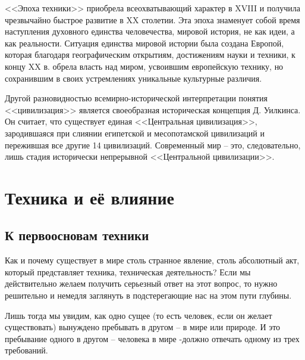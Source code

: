 <<Эпоха техники>> приобрела всеохватывающий характер в XVIII и получила 
чрезвычайно быстрое развитие в XX столетии. Эта эпоха знаменует собой время 
наступления духовного единства человечества, мировой история, не как идеи, а 
как реальности. Ситуация единства мировой истории была создана Европой, 
которая благодаря географическим открытиям, достижениям науки и техники, к 
концу XX в. обрела власть над миром, усвоившим европейскую технику, но 
сохранившим в своих устремлениях уникальные культурные различия.

Другой разновидностью всемирно-исторической интерпретации понятия 
<<цивилизация>> является своеобразная историческая концепция Д. Уилкинса. Он 
считает, что существует единая <<Центральная цивилизация>>, зародившаяся при 
слиянии египетской и месопотамской цивилизаций и пережившая все другие 14 
цивилизаций. Современный мир -- это, следовательно, лишь стадия исторически 
непрерывной <<Центральной цивилизации>>.\cite{net:01}

\section{Техника и её влияние}

\subsection{К первоосновам техники}

Как и почему существует в мире столь странное явление, столь абсолютный акт, 
который представляет техника, техническая деятельность? Если мы действительно 
желаем получить серьезный ответ на этот вопрос, то нужно решительно и немедля 
заглянуть в подстерегающие нас на этом пути глубины.

Лишь тогда мы увидим, как одно сущее (то есть человек, если он желает 
существовать) вынуждено пребывать в другом -- в мире или природе. И это 
пребывание одного в другом -- человека в мире -должно отвечать одному из трех 
требований.

